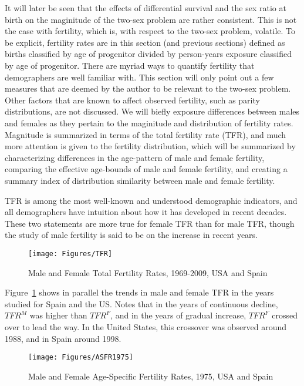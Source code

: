  \FloatBarrier
 \label{sec:dimorphASFR}
 
It will later be seen that the effects of differential survival and the
sex ratio at birth on the maginitude of the two-sex problem are rather
consistent. This is not the case with fertility, which is, with respect
to the two-sex problem, volatile. To be explicit, fertility rates are in this
section (and previous sections) defined as births classified by age of
progenitor divided by person-years exposure classified by age of progenitor.
There are myriad ways to quantify fertility that demographers are well familiar
with. This section will only point out a few measures that are deemed by the
author to be relevant to the two-sex problem. Other factors that are known to
affect observed fertility, such as parity distributions, are not discussed. We
will biefly exposure differences between males and females as they pertain to
the maginitude and distribution of fertility rates. Magnitude is summarized in
terms of the total fertility rate (TFR), and much more attention is given to the
fertility distribution, which will be summarized by characterizing differences
in the age-pattern of male and female fertility, comparing the effective
age-bounds of male and female fertility, and creating a summary index of
distribution similarity between male and female fertility.

TFR is among the most well-known and understood demographic indicators, and all
demographers have intuition about how it has developed in recent decades. These
two statements are more true for female TFR than for male TFR, though the study
of male fertility is said to be on the increase in recent years.

\begin{figure}[ht!]
        \centering  
          \caption{Male and Female Total Fertility Rates, 1969-2009, USA and
          Spain}
           \texttt{[image: Figures/TFR]}
          \label{fig:TFRseries}
\end{figure}

Figure~\ref{fig:TFRseries} shows in parallel the trends in male and female TFR
in the years studied for Spain and the US. Notes that
in the years of continuous decline, $TFR^M$ was higher than $TFR^F$, and in the years 
of gradual increase, $TFR^F$ crossed over to lead the way. In the United States,
this crossover was observed around 1988, and in Spain around 1998. 

\begin{figure}[ht!]
        \centering  
          \caption{Male and Female Age-Specific Fertility Rates, 1975, USA and
          Spain}
           \texttt{[image: Figures/ASFR1975]}  
          \label{fig:ASFR1975}
\end{figure}

